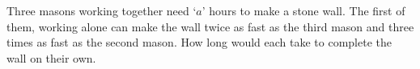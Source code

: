 
%
%
%
%
% 
% 

\question[3] Three masons working together need `$a$' hours to make a stone wall. The first of them, working alone can make the wall twice as fast as the third mason and three times as fast as the second mason. How long would each take to complete the wall on their own.


\ifprintanswers
\fi 

